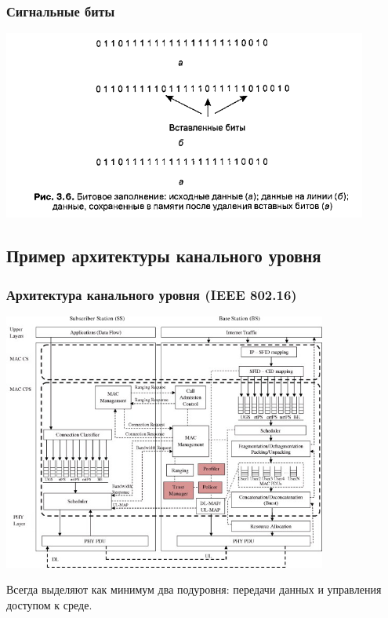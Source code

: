 \documentclass[utf8]{beamer}
\begin{document}
\begin{frame}
\frametitle{Сигнальные биты}
\begin{center}
\includegraphics[width=0.9\textwidth]{pic/bi-delimiter.png}
\end{center}
\end{frame}
\subsection{Пример архитектуры канального уровня}
\begin{frame}
\frametitle{Архитектура канального уровня (IEEE 802.16)}
\begin{center}
\includegraphics[width=0.8\textwidth]{pic/802-16.jpg}
\end{center}
Всегда выделяют как минимум два подуровня: передачи данных и управления доступом к среде.
\end{frame}
\end{document}
